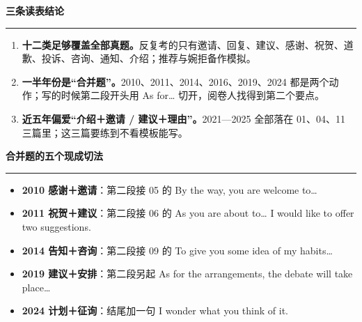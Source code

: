\documentclass[11pt,a4paper]{ctexart}
\begin{document}
\vspace{12pt}
{\color{accent}\bfseries 三条读表结论}\par
{\color{rule}\rule{\linewidth}{0.5pt}}\par\vspace{4pt}
{\footnotesize
\begin{enumerate}[leftmargin=1.4em,rightmargin=6pt,itemsep=2pt,topsep=1pt,parsep=0pt]
\item {\bfseries 十二类足够覆盖全部真题。}反复考的只有邀请、回复、建议、感谢、祝贺、道歉、投诉、咨询、通知、介绍；推荐与婉拒备作模拟。
\item {\bfseries 一半年份是“合并题”。}2010、2011、2014、2016、2019、2024 都是两个动作；写的时候第二段开头用 As for… 切开，阅卷人找得到第二个要点。
\item {\bfseries 近五年偏爱“介绍＋邀请 / 建议＋理由”。}2021—2025 全部落在 01、04、11 三篇里；这三篇要练到不看模板能写。
\end{enumerate}}\par

\vspace{8pt}
{\color{accent}\bfseries 合并题的五个现成切法}\par
{\color{rule}\rule{\linewidth}{0.5pt}}\par\vspace{4pt}
{\footnotesize
\begin{itemize}[leftmargin=1.2em,itemsep=2pt,topsep=1pt,parsep=0pt]
\item {\bfseries 2010 感谢＋邀请}：第二段接 05 的 By the way, you are welcome to…
\item {\bfseries 2011 祝贺＋建议}：第二段接 06 的 As you are about to… I would like to offer two suggestions.
\item {\bfseries 2014 告知＋咨询}：第二段接 09 的 To give you some idea of my habits…
\item {\bfseries 2019 建议＋安排}：第二段另起 As for the arrangements, the debate will take place…
\item {\bfseries 2024 计划＋征询}：结尾加一句 I wonder what you think of it.
\end{itemize}}\par
\end{document}
